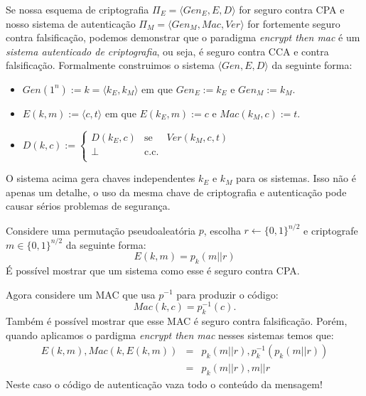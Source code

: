 Se nossa esquema de criptografia $\Pi_E = \langle Gen_E, E, D\rangle$ for seguro contra CPA e nosso sistema de autenticação $\Pi_M = \langle Gen_M, Mac, Ver \rangle$ for fortemente seguro contra falsificação, podemos demonstrar que o paradigma {\em encrypt then mac} é um {\em sistema autenticado de criptografia}, ou seja, é seguro contra CCA e contra falsificação.
Formalmente construimos o sistema $\langle Gen, E, D \rangle$ da seguinte forma:
\begin{itemize}
\item $Gen(1^n) := k = \langle k_E, k_M \rangle$ em que $Gen_E := k_E$ e $Gen_M := k_M$.
\item $E(k,m) := \langle c, t \rangle$ em que $E(k_E, m) := c$ e $Mac(k_M, c) := t$.
\item $D(k,c) := \left\{
    \begin{array}{lcl}
      D(k_E, c) & \textrm{se} & Ver(k_M, c, t)\\
      \bot & \textrm{c.c.} &\\
    \end{array}
    \right.$
\end{itemize}

O sistema acima gera chaves independentes $k_E$ e $k_M$ para os sistemas.
Isso não é apenas um detalhe, o uso da mesma chave de criptografia e autenticação pode causar sérios problemas de segurança.


\begin{example}
  Considere uma permutação pseudoaleatória $p$, escolha $r \leftarrow\{0,1\}^{n/2}$ e criptografe $m \in \{0,1\}^{n/2}$ da seguinte forma:
  \begin{displaymath}
    E(k,m) = p_k(m||r)
  \end{displaymath}
É possível mostrar que um sistema como esse é seguro contra CPA.

Agora considere um MAC que usa $p^{-1}$ para produzir o código:
\begin{displaymath}
  Mac(k,c) = p_k^{-1}(c).  
\end{displaymath}
Também é possível mostrar que esse MAC é seguro contra falsificação.
Porém, quando aplicamos o pardigma {\em encrypt then mac} nesses sistemas temos que:
\begin{eqnarray*}
  E(k,m), Mac(k, E(k,m)) & = & p_k(m||r), p_k^{-1}(p_k(m||r))\\
                         & = & p_k(m||r), m||r
\end{eqnarray*}
Neste caso o código de autenticação vaza todo o conteúdo da mensagem!
\end{example}


